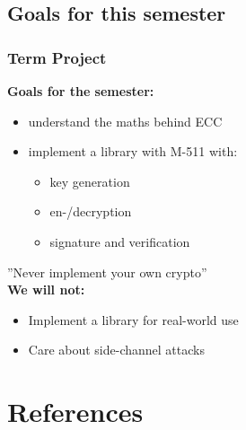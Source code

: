 \documentclass{beamer}
\begin{document}
\subsection{Goals for this semester}
	\begin{frame}
		\frametitle{Term Project}
		\textbf{Goals for the semester:}
		\begin{itemize}
			\item understand the maths behind ECC
			\item implement a library with M-511 with:
			\begin{itemize}
				\item key generation
				\item en-/decryption
				\item signature and verification
			\end{itemize}
		\end{itemize}
	
		\vspace{0.8cm}
		''Never implement your own crypto'' \\
		\vspace{0.8cm}
		\textbf{We will not:}
		\begin{itemize}
			\item Implement a library for real-world use
			\item Care about side-channel attacks
		\end{itemize}
	\end{frame}
\section{References}
\end{document}
